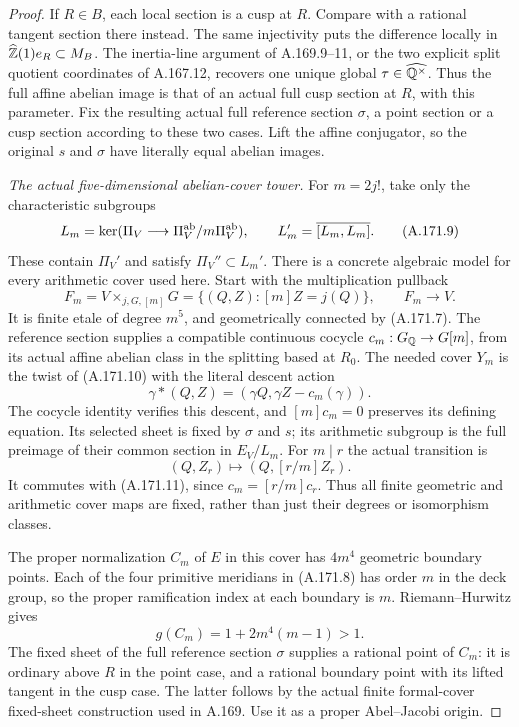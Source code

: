 \begin{proof}
If \(R\in B\), each local section is a cusp at \(R\).
Compare with a rational tangent section there instead.  The same
injectivity puts the difference locally in
\(\widehat{\mathbb Z}(1)e_R\subset M_B\).  The inertia-line argument
of A.169.9--11, or the two explicit split quotient coordinates of
A.167.12, recovers one unique global
\(\tau\in\widehat{\mathbb Q^\times}\).  Thus the full affine
abelian image is that of an actual full cusp section at \(R\),
with this parameter.  Fix the resulting actual full reference
section \(\sigma\), a point section or a cusp section according
to these two cases.  Lift the affine conjugator, so the original
\(s\) and \(\sigma\) have literally equal abelian images.

\emph{The actual five-dimensional abelian-cover tower.}
For \(m=2j!\), take only the characteristic subgroups
\[
 L_m=\ker(\Pi_V\longrightarrow\Pi_V^{\rm ab}/m\Pi_V^{\rm ab}),
                    \qquad L_m'=\overline{[L_m,L_m]}.
\tag{A.171.9}
\]
These contain \(\Pi_V'\) and satisfy \(\Pi_V''\subset L_m'\).
There is a concrete algebraic model for every arithmetic cover used
here.  Start with the multiplication pullback
\[
       F_m=V\times_{j,G,[m]}G
           =\{(Q,Z):[m]Z=j(Q)\},
                          \qquad F_m\longrightarrow V.
\tag{A.171.10}
\]
It is finite etale of degree \(m^5\), and geometrically connected
by (A.171.7).  The reference section supplies a compatible
continuous cocycle \(c_m:G_\mathbb Q\to G[m]\), from its actual affine
abelian class in the splitting based at \(R_0\).
The needed cover \(Y_m\) is the twist of (A.171.10) with the
literal descent action
\[
       \gamma*(Q,Z)=(\gamma Q,\gamma Z-c_m(\gamma)).
\tag{A.171.11}
\]
The cocycle identity verifies this descent, and \([m]c_m=0\)
preserves its defining equation.  Its selected sheet is fixed by
\(\sigma\) and \(s\); its arithmetic subgroup is the full
preimage of their common section in \(E_V/L_m\).
For \(m\mid r\) the actual transition is
\[
                  (Q,Z_r)\longmapsto(Q,[r/m]Z_r).
\tag{A.171.12}
\]
It commutes with (A.171.11), since
\(c_m=[r/m]c_r\).  Thus all finite geometric and arithmetic
cover maps are fixed, rather than just their degrees or isomorphism
classes.

The proper normalization \(C_m\) of \(E\) in this cover has
\(4m^4\) geometric boundary points.  Each of the four primitive
meridians in (A.171.8) has order \(m\) in the deck group, so
the proper ramification index at each boundary is \(m\).
Riemann--Hurwitz gives
\[
                  g(C_m)=1+2m^4(m-1)>1.
\tag{A.171.13}
\]
The fixed sheet of the full reference section \(\sigma\)
supplies a rational point of \(C_m\): it is ordinary above
\(R\) in the point case, and a rational boundary point with its
lifted tangent in the cusp case.  The latter follows by the actual
finite formal-cover fixed-sheet construction used in A.169.
Use it as a proper Abel--Jacobi origin.


\end{proof}
